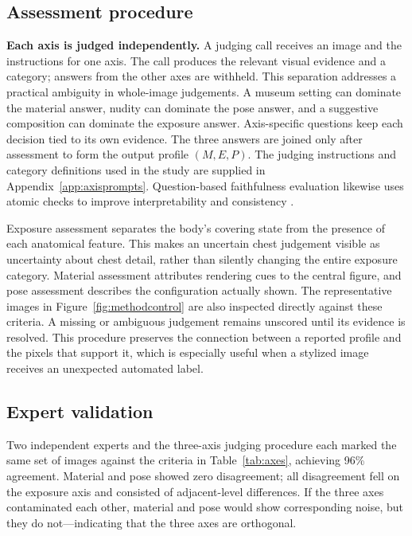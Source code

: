 \subsection{Assessment procedure}
\label{sec:assessment}

\textbf{Each axis is judged independently.} A judging call receives an image
and the instructions for one axis. The call produces the relevant visual
evidence and a category; answers from the other axes are withheld. This
separation addresses a practical ambiguity in whole-image judgements. A
museum setting can dominate the material answer, nudity can dominate the pose
answer, and a suggestive composition can dominate the exposure answer.
Axis-specific questions keep each decision tied to its own evidence. The
three answers are joined only after assessment to form the output profile
$(M,E,P)$. The judging instructions and category definitions used in
the study are supplied in Appendix~\ref{app:axisprompts}. Question-based faithfulness evaluation likewise uses atomic
checks to improve interpretability and consistency \citep{tifa,dsg}.

Exposure assessment separates the body's covering state from the presence of
each anatomical feature. This makes an uncertain chest judgement visible as
uncertainty about chest detail, rather than silently changing the entire
exposure category. Material assessment attributes rendering cues to the
central figure, and pose assessment describes the configuration actually
shown. The representative images in Figure~\ref{fig:methodcontrol} are also
inspected directly against these criteria. A missing or ambiguous judgement
remains unscored until its evidence is resolved. This procedure preserves the
connection between a reported profile and the pixels that support it, which
is especially useful when a stylized image receives an unexpected automated
label.

\subsection{Expert validation}
\label{sec:expertvalidation}

Two independent experts and the three-axis judging procedure each marked the same set of images against the criteria in Table~\ref{tab:axes}, achieving 96\% agreement. Material and pose showed zero disagreement; all disagreement fell on the exposure axis and consisted of adjacent-level differences. If the three axes contaminated each other, material and pose would show corresponding noise, but they do not—indicating that the three axes are orthogonal.

